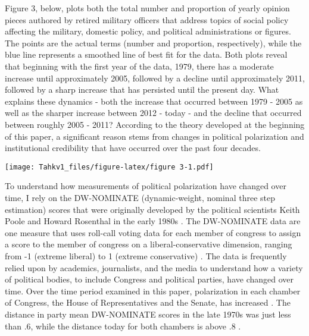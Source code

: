 \documentclass[12pt,]{article}
\begin{document}
Figure 3, below, plots both the total number and proportion of yearly opinion pieces authored by retired military officers that address topics of social policy affecting the military, domestic policy, and political administrations or figures. The points are the actual terms (number and proportion, respectively), while the blue line represents a smoothed line of best fit for the data. Both plots reveal that beginning with the first year of the data, 1979, there has a moderate increase until approximately 2005, followed by a decline until approximately 2011, followed by a sharp increase that has persisted until the present day. What explains these dynamics - both the increase that occurred between 1979 - 2005 as well as the sharper increase between 2012 - today - and the decline that occurred between roughly 2005 - 2011? According to the theory developed at the beginning of this paper, a significant reason stems from changes in political polarization and institutional credibility that have occurred over the past four decades.

\texttt{[image: Tahkv1\_files/figure-latex/figure 3-1.pdf]}

To understand how measurements of political polarization have changed over time, I rely on the DW-NOMINATE (dynamic-weight, nominal three step estimation) scores that were originally developed by the political scientists Keith Poole and Howard Rosenthal in the early 1980s \autocite{jeffrey_b_lewis_voteview_2020}. The DW-NOMINATE data are one measure that uses roll-call voting data for each member of congress to assign a score to the member of congress on a liberal-conservative dimension, ranging from -1 (extreme liberal) to 1 (extreme conservative) \autocite{jeffrey_b_lewis_voteview_2020}. The data is frequently relied upon by academics, journalists, and the media to understand how a variety of political bodies, to include Congress and political parties, have changed over time. Over the time period examined in this paper, polarization in each chamber of Congress, the House of Representatives and the Senate, has increased \autocite{jeffrey_b_lewis_voteview_2020}. The distance in party mean DW-NOMINATE scores in the late 1970s was just less than .6, while the distance today for both chambers is above .8 \autocite{jeffrey_b_lewis_voteview_2020}.
\end{document}

